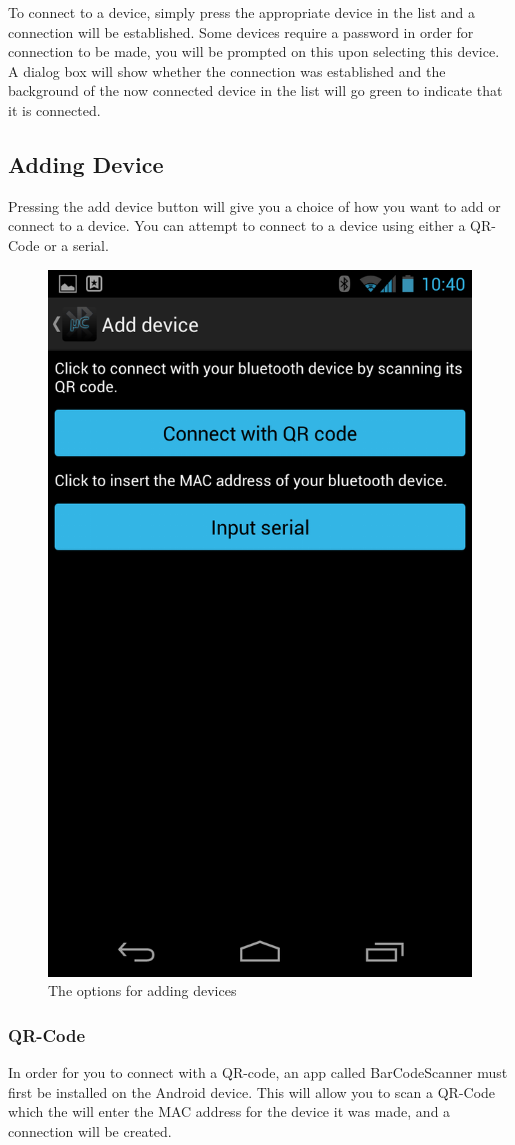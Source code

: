 		 To connect to a device, simply press the appropriate device in the list and a connection will be established. Some devices require a password in order for connection to be made, you will be prompted on this upon selecting this device. A dialog box will show whether the connection was established and the background of the now connected device in the list will go green to indicate that it is connected. \\

		\subsection{Adding Device}
			Pressing the add device button will give you a choice of how you want to add or connect to a device. You can attempt to connect to a device using either a QR-Code or a serial.
		\newline
		\begin{figure}[H]
			\centering
			\includegraphics[width=0.5 \textwidth]{images/Screenshots/add_device.png}
			\caption{The options for adding devices}
		\end{figure}

			\subsubsection{QR-Code}
				In order for you to connect with a QR-code, an app called BarCodeScanner must first be installed on the Android device. This will allow you to scan a QR-Code which the will enter the MAC address for the device it was made, and a connection will be created.\\

